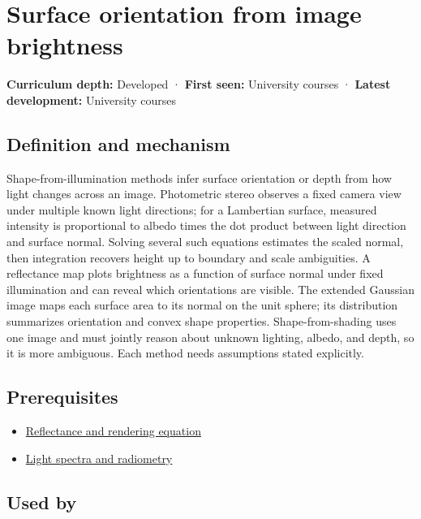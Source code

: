 \hypertarget{appendix-89b2d5b7c9e1}{}\label{referencestart:appendix-89b2d5b7c9e1}
\section{Surface orientation from image brightness}\label{appendix-89b2d5b7c9e1-surface-orientation-from-image-brightness}

\textbf{Curriculum depth:} Developed · \textbf{First seen:} University courses · \textbf{Latest development:} University courses

\subsection{Definition and mechanism}\label{appendix-89b2d5b7c9e1-definition-and-mechanism}

Shape-from-illumination methods infer surface orientation or depth from how light changes across an image. Photometric stereo observes a fixed camera view under multiple known light directions; for a Lambertian surface, measured intensity is proportional to albedo times the dot product between light direction and surface normal. Solving several such equations estimates the scaled normal, then integration recovers height up to boundary and scale ambiguities. A reflectance map plots brightness as a function of surface normal under fixed illumination and can reveal which orientations are visible. The extended Gaussian image maps each surface area to its normal on the unit sphere; its distribution summarizes orientation and convex shape properties. Shape-from-shading uses one image and must jointly reason about unknown lighting, albedo, and depth, so it is more ambiguous. Each method needs assumptions stated explicitly.

\subsection{Prerequisites}\label{appendix-89b2d5b7c9e1-prerequisites}

\begin{itemize}
\tightlist
\item
  \hyperref[appendix-96da0b153b77]{Reflectance and rendering equation}
\item
  \hyperref[appendix-215c2570199b]{Light spectra and radiometry}
\end{itemize}

\subsection{Used by}\label{appendix-89b2d5b7c9e1-used-by}

